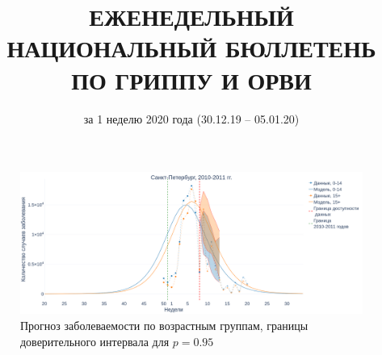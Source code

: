 \documentclass[a4paper, 12pt]{article}
\title{\Large{ЕЖЕНЕДЕЛЬНЫЙ НАЦИОНАЛЬНЫЙ БЮЛЛЕТЕНЬ ПО ГРИППУ И ОРВИ}}
\author{за 1 неделю 2020 года (30.12.19 -- 05.01.20)}
\date{}
\def\mywidth{14}
\begin{document}
\maketitle


\maketitle
\begin{figure}[!ht]
    \centering
    \includegraphics[width=\mywidth cm]{age-group_forecast.png}
    \caption{Прогноз заболеваемости по возрастным группам, границы доверительного интервала для $p = 0.95$}
    \label{fig:enter-label}
\end{figure}





\end{document}
